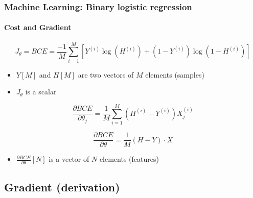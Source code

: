 \documentclass[xcolor=table]{beamer}
\begin{document}
\begin{frame}
	\frametitle{Machine Learning: Binary logistic regression}
	\framesubtitle{Cost and Gradient}

	\[J_\theta = BCE = \frac{-1}{M} \sum\limits_{i=1}^{M} [Y^{(i)} \log(H^{(i)}) + (1- Y^{(i)}) \log(1 - H^{(i)})]\]
	\begin{itemize}
		\item $Y[M]$ and $H[M]$ are two vectors of $M$ elements (samples)
		\item $J_\theta$ is a scalar
	\end{itemize}
	
	
	\[
	\frac{\partial BCE}{\partial \theta_j} = \frac{1}{M} \sum\limits_{i=1}^{M} (H^{(i)} - Y^{(i)}) X_j^{(i)}
	\]
	
	\[
	\frac{\partial BCE}{\partial \theta} = \frac{1}{M} (H - Y) \cdot X
	\]
	
	\begin{itemize}
		\item $\frac{\partial BCE}{\partial \theta}[N]$ is a vector of $N$ elements (features)
	\end{itemize}
	
\end{frame}

\subsection{Gradient (derivation)}
\end{document}
